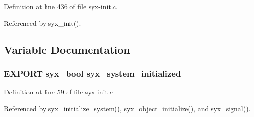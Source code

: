 Definition at line 436 of file syx-init.c.

Referenced by syx\_\-init().

\subsection{Variable Documentation}
\hypertarget{syx-init_8h_532ac7708947b6d7d89531593bc54492}{
\subsubsection{\setlength{\rightskip}{0pt plus 5cm}EXPORT {\bf syx\_\-bool} {\bf syx\_\-system\_\-initialized}}}
\label{syx-init_8h_532ac7708947b6d7d89531593bc54492}




Definition at line 59 of file syx-init.c.

Referenced by syx\_\-initialize\_\-system(), syx\_\-object\_\-initialize(), and syx\_\-signal().